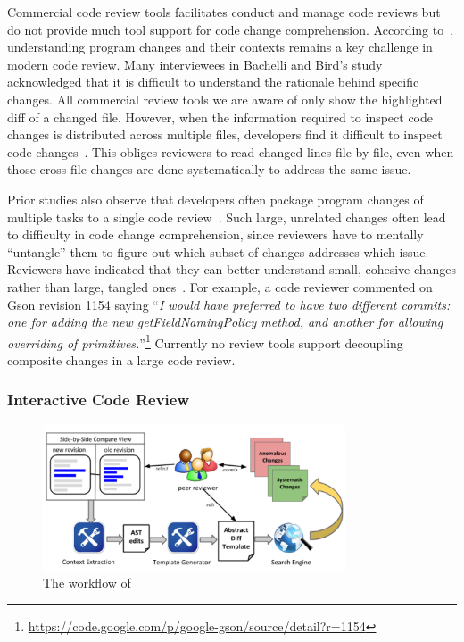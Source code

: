 \documentclass[runningheads,a4paper]{llncs}
\begin{document}
Commercial code review tools facilitates conduct and manage code reviews but do not provide much tool support for code change comprehension. According to~\cite{bacchelli2013expectations}, understanding program changes and their contexts remains a key challenge in modern code review. Many interviewees in Bachelli and Bird's study acknowledged that it is difficult to understand the rationale behind specific changes. All commercial review tools we are aware of only show the highlighted diff of a changed file. However, when the information required to inspect code changes is distributed across multiple files, developers find it difficult to inspect code changes~\cite{dunsmore2000object}. This obliges reviewers to read changed lines file by file, even when those cross-file changes are done systematically to address the same issue. 

Prior studies also observe that developers often package program changes of multiple tasks to a single code review~\cite{kawrykow2011non,Murphy-Hill2012:refactor,herzig2013impact}. Such large, unrelated changes often lead to difficulty in code change comprehension, since reviewers have to mentally ``untangle'' them to figure out which subset of changes addresses which issue. Reviewers have indicated that they can better understand small, cohesive changes rather than large, tangled ones~\cite{rigby2008open}. For example, a code reviewer commented on Gson revision 1154 saying ``{\em I would have preferred to have two different commits: one for adding the new {\ttt getFieldNamingPolicy} method, and another for allowing overriding of primitives.}''\footnote{\url{https://code.google.com/p/google-gson/source/detail?r=1154}} Currently no review tools support decoupling composite changes in a large code review. 

\subsubsection{Interactive Code Review} 

\begin{figure}[ht]
 \centering
 \includegraphics[width=0.8\textwidth]{images/critics-workflow.pdf}
 \caption{The workflow of {\critics}}
 \label{fig:critics-workflow}
\end{figure}
\end{document}
